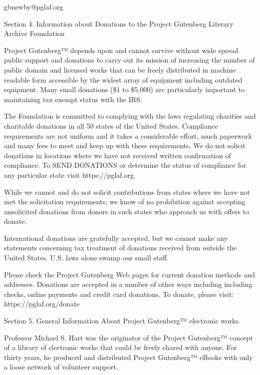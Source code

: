 {   \quad\quad gbnewby@pglaf.org

\begin{center}
Section 4. Information about Donations to the Project Gutenberg
Literary Archive Foundation
\end{center}

Project Gutenberg™ depends upon and cannot survive without wide
spread public support and donations to carry out its mission of
increasing the number of public domain and licensed works that can be
freely distributed in machine readable form accessible by the widest
array of equipment including outdated equipment. Many small donations
(\$1 to \$5,000) are particularly important to maintaining tax exempt
status with the IRS.

The Foundation is committed to complying with the laws regulating
charities and charitable donations in all 50 states of the United
States. Compliance requirements are not uniform and it takes a
considerable effort, much paperwork and many fees to meet and keep up
with these requirements. We do not solicit donations in locations
where we have not received written confirmation of compliance. To
SEND DONATIONS or determine the status of compliance for any
particular state visit https://pglaf.org

While we cannot and do not solicit contributions from states where we
have not met the solicitation requirements, we know of no prohibition
against accepting unsolicited donations from donors in such states who
approach us with offers to donate.

International donations are gratefully accepted, but we cannot make
any statements concerning tax treatment of donations received from
outside the United States. U.S. laws alone swamp our small staff.

Please check the Project Gutenberg Web pages for current donation
methods and addresses. Donations are accepted in a number of other
ways including including checks, online payments and credit card
donations. To donate, please visit: https://pglaf.org/donate

\begin{center}
Section 5. General Information About Project Gutenberg™ electronic
works.
\end{center}

Professor Michael S. Hart was the originator of the Project Gutenberg™
concept of a library of electronic works that could be freely shared
with anyone. For thirty years, he produced and distributed Project
Gutenberg™ eBooks with only a loose network of volunteer support.

}
